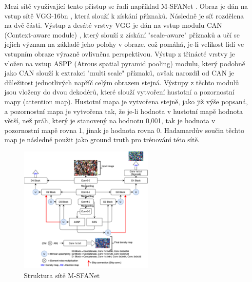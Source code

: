 \begin{description}
Mezi sítě využívající tento přístup se řadí například M-SFANet \cite{MSFANet_for_crowd_counting}.
Obraz je dán na vstup sítě VGG-16bn \cite{VGG}, která slouží k získání příznaků.
Následně je síť rozdělena na dvě části.
Výstup z desáté vrstvy VGG je dán na vstup modulu CAN (Context-aware module) \cite{CAN_1, CAN_2}, který slouží z získání "scale-aware" příznaků a učí se jejich význam na základě jeho polohy v obraze, což pomáhá, je-li velikost lidí ve vstupním obraze výrazně ovlivněna perspektivou.
Výstup z třinácté vrstvy je vložen na vstup ASPP \cite{ASPP} (Atrous spatial pyramid pooling) modulu, který podobně jako CAN slouží k extrakci "multi scale" příznaků, avšak narozdíl od CAN je důležitost jednotlivých napříč celým obrazem stejná.
Výstupy z těchto modulů jsou vloženy do dvou dekodérů, které slouží vytvoření hustotní a pozornostní mapy (attention map).
Hustotní mapa je vytvořena stejně, jako již výše popsaná, a pozornostní mapa je vytvořena tak, že je-li hodnota v hustotní mapě hodnota větší, než práh, který je stanovený na hodnotu 0,001, tak je hodnota v pozornostní mapě rovna 1, jinak je hodnota rovna 0.
Hadamardův součin těchto map je následně použit jako ground truth pro trénování této sítě.

\begin{figure}[h!]
	\centering
	\includegraphics[width=0.6\textwidth]{Figures/history/MSFANet.png}
	\caption{Struktura sítě M-SFANet \cite{MSFANet_for_crowd_counting}}
	\label{fig:M-SFANet}
\end{figure}

\end{description}







\endinput